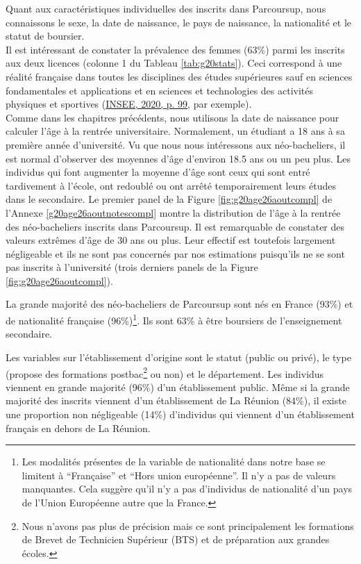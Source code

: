 \documentclass[
]{book}
\begin{document}
Quant aux caractéristiques individuelles des inscrits dans Parcoursup, nous connaissons le sexe, la date de naissance, le pays de naissance, la nationalité et le statut de boursier.\\
Il est intéressant de constater la prévalence des femmes (63\%) parmi les inscrits aux deux licences (colonne 1 du Tableau \ref{tab:g20stats}). Ceci correspond à une réalité française dans toutes les disciplines des études supérieures sauf en sciences fondamentales et applications et en sciences et technologies des activités physiques et sportives (\protect\hyperlink{ref-INS:20}{INSEE, 2020, p. 99}, par exemple).\\
Comme dans les chapitres précédents, nous utilisons la date de naissance pour calculer l'âge à la rentrée universitaire. Normalement, un étudiant a 18 ans à sa première année d'université. Vu que nous nous intéressons aux néo-bacheliers, il est normal d'observer des moyennes d'âge d'environ 18.5 ans ou un peu plus. Les individus qui font augmenter la moyenne d'âge sont ceux qui sont entré tardivement à l'école, ont redoublé ou ont arrêté temporairement leurs études dans le secondaire. Le premier panel de la Figure \ref{fig:g20age26aoutcompl} de l'Annexe \ref{g20age26aoutnotescompl} montre la distribution de l'âge à la rentrée des néo-bacheliers inscrits dans Parcoursup. Il est remarquable de constater des valeurs extrêmes d'âge de 30 ans ou plus. Leur effectif est toutefois largement négligeable et ils ne sont pas concernés par nos estimations puisqu'ils ne se sont pas inscrits à l'université (trois derniers panels de la Figure \ref{fig:g20age26aoutcompl}).

La grande majorité des néo-bacheliers de Parcoursup sont nés en France (93\%) et de nationalité française (96\%)\footnote{Les modalités présentes de la variable de nationalité dans notre base se limitent à ``Française'' et ``Hors union européenne''. Il n'y a pas de valeurs manquantes. Cela suggère qu'il n'y a pas d'individus de nationalité d'un pays de l'Union Européenne autre que la France.}. Ils sont 63\% à être boursiers de l'enseignement secondaire.

Les variables sur l'établissement d'origine sont le statut (public ou privé), le type (propose des formations postbac\footnote{Nous n'avons pas plus de précision mais ce sont principalement les formations de Brevet de Technicien Supérieur (BTS) et de préparation aux grandes écoles.} ou non) et le département. Les individus viennent en grande majorité (96\%) d'un établissement public. Même si la grande majorité des inscrits viennent d'un établissement de La Réunion (84\%), il existe une proportion non négligeable (14\%) d'individus qui viennent d'un établissement français en dehors de La Réunion.
\end{document}
